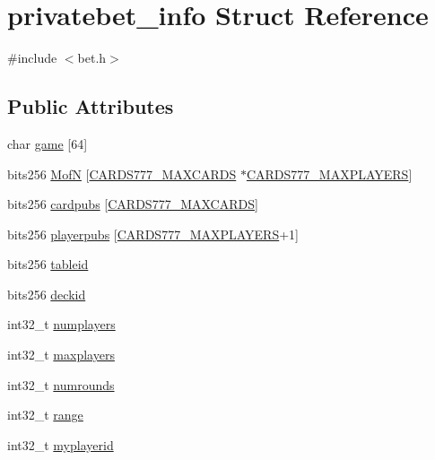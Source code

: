 \hypertarget{structprivatebet__info}{}\section{privatebet\+\_\+info Struct Reference}
\label{structprivatebet__info}


{\ttfamily \#include $<$bet.\+h$>$}

\subsection*{Public Attributes}
\begin{DoxyCompactItemize}
\item 
char \hyperlink{structprivatebet__info_a9f134d6dc6e24c2382cc9a937a8c4fd9}{game} \mbox{[}64\mbox{]}
\item 
bits256 \hyperlink{structprivatebet__info_ac33fc414297eac35e0e50eefcce9e358}{MofN} \mbox{[}\hyperlink{common_8h_a90f0ea2d767ac1915e44acb24a1fe1bd}{C\+A\+R\+D\+S777\+\_\+\+M\+A\+X\+C\+A\+R\+DS} $\ast$\hyperlink{common_8h_a97d6188fd175f4ea7268e9445107a7c0}{C\+A\+R\+D\+S777\+\_\+\+M\+A\+X\+P\+L\+A\+Y\+E\+RS}\mbox{]}
\item 
bits256 \hyperlink{structprivatebet__info_a8f79ab33689ddb0e10858491ec02a896}{cardpubs} \mbox{[}\hyperlink{common_8h_a90f0ea2d767ac1915e44acb24a1fe1bd}{C\+A\+R\+D\+S777\+\_\+\+M\+A\+X\+C\+A\+R\+DS}\mbox{]}
\item 
bits256 \hyperlink{structprivatebet__info_ad834b583e3a2f3b8607420c42751e376}{playerpubs} \mbox{[}\hyperlink{common_8h_a97d6188fd175f4ea7268e9445107a7c0}{C\+A\+R\+D\+S777\+\_\+\+M\+A\+X\+P\+L\+A\+Y\+E\+RS}+1\mbox{]}
\item 
bits256 \hyperlink{structprivatebet__info_a2092f6f498aad90aa677505b82e48c9e}{tableid}
\item 
bits256 \hyperlink{structprivatebet__info_ac742825adc9a2808a8e0d18390e18b24}{deckid}
\item 
int32\+\_\+t \hyperlink{structprivatebet__info_a8a60dda249031fc496a0307c34f3cb69}{numplayers}
\item 
int32\+\_\+t \hyperlink{structprivatebet__info_a2d44b99e9160029507e6e0d04b92dbd4}{maxplayers}
\item 
int32\+\_\+t \hyperlink{structprivatebet__info_ae9386be7e568fdb22e00cb600834fc7b}{numrounds}
\item 
int32\+\_\+t \hyperlink{structprivatebet__info_af01242479bf0e4175782043883b177f8}{range}
\item 
int32\+\_\+t \hyperlink{structprivatebet__info_ad502ebd5a1f56f383db682da311e813e}{myplayerid}

\end{DoxyCompactItemize}
